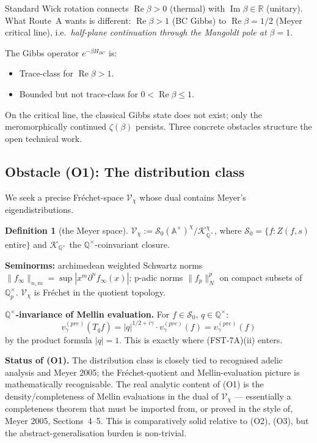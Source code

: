 \documentclass[11pt,a4paper]{article}
\theoremstyle{plain}
\theoremstyle{definition}
\newtheorem{definition}[theorem]{Definition}
\newcommand{\R}{\mathbb{R}}
\newcommand{\Q}{\mathbb{Q}}
\newcommand{\A}{\mathbb{A}}
\newcommand{\V}{\mathcal{V}}
\renewcommand{\S}{\mathcal{S}}
\newcommand{\K}{\mathcal{K}}
\newcommand{\chifn}{\chi}
\renewcommand{\Re}{\operatorname{Re}}
\renewcommand{\Im}{\operatorname{Im}}
\begin{document}
Standard Wick rotation connects $\Re\beta > 0$ (thermal) with
$\Im\beta \in \R$ (unitary).  What Route~A wants is different:
$\Re\beta > 1$ (BC Gibbs) to $\Re\beta = 1/2$ (Meyer critical line),
i.e.~\emph{half-plane continuation through the Mangoldt pole at
$\beta = 1$}.

The Gibbs operator $e^{-\beta H_{BC}}$ is:
\begin{itemize}
\item Trace-class for $\Re\beta > 1$.
\item Bounded but not trace-class for $0 < \Re\beta \leq 1$.
\end{itemize}

On the critical line, the classical Gibbs state does not exist;
only the meromorphically continued $\zeta(\beta)$ persists.  Three
concrete obstacles structure the open technical work.

\subsection{Obstacle (O1): The distribution class}

We seek a precise Fr\'echet-space $\V_\chifn$ whose dual contains
Meyer's eigendistributions.

\begin{definition}[the Meyer space]
\label{def:meyer-space}
$\V_\chifn := \S_0(\A^\times)^\chifn / \K_{\Q^\times}^\chifn$,
where $\S_0 = \{f : Z(f, s)$ entire$\}$ and $\K_{\Q^\times}$ the
$\Q^\times$-coinvariant closure.
\end{definition}

\textbf{Seminorms:} archimedean weighted Schwartz norms
$\|f_\infty\|_{n,m} = \sup |x^m \partial^n f_\infty(x)|$; p-adic
norms $\|f_p\|_N^p$ on compact subsets of $\Q_p^\times$.
$\V_\chifn$ is Fr\'echet in the quotient topology.

\textbf{$\Q^\times$-invariance of Mellin evaluation.}  For $f \in
\S_0$, $q \in \Q^\times$:
\[
  v_\gamma^{(pre)}(T_q f) = |q|^{1/2+i\gamma} \cdot
    v_\gamma^{(pre)}(f) = v_\gamma^{(pre)}(f)
\]
by the product formula $|q| = 1$.  This is exactly where (FST-7A)(ii)
enters.

\textbf{Status of (O1).}  The distribution class is closely tied to
recognised adelic analysis and Meyer 2005; the Fr\'echet-quotient
and Mellin-evaluation picture is mathematically recognisable.  The
real analytic content of (O1) is the density/completeness of Mellin
evaluations in the dual of $\V_\chifn$ --- essentially a completeness
theorem that must be imported from, or proved in the style of,
Meyer 2005, Sections~4--5.  This is comparatively solid relative to (O2),
(O3), but the abstract-generalisation burden is non-trivial.
\end{document}
